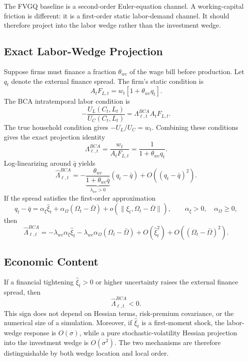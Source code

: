 \documentclass[11pt]{article}
\theoremstyle{plain}
\theoremstyle{definition}
\begin{document}
The FVGQ baseline is a second-order Euler-equation channel. A working-capital
friction is different: it is a first-order static labor-demand channel. It
should therefore project into the labor wedge rather than the investment wedge.

\subsection{Exact Labor-Wedge Projection}

Suppose firms must finance a fraction $\theta_{wc}$ of the wage bill before
production. Let $q_t$ denote the external finance spread. The firm's static
condition is
\begin{equation}
A_tF_{L,t}
=
w_t[1+\theta_{wc}q_t].
\tag{WC-FOC}
\end{equation}
The BCA intratemporal labor condition is
\begin{equation}
-\frac{U_L(C_t,L_t)}{U_C(C_t,L_t)}
=
\Lambda_{\ell,t}^{BCA} A_tF_{L,t}.
\tag{BCA-L}
\end{equation}
The true household condition gives $-U_L/U_C=w_t$. Combining these conditions
gives the exact projection identity
\begin{equation}
\boxed{
\Lambda_{\ell,t}^{BCA}
=
\frac{w_t}{A_tF_{L,t}}
=
\frac{1}{1+\theta_{wc}q_t}
}.
\tag{WC-P}
\end{equation}
Log-linearizing around $\bar q$ yields
\begin{equation}
\hat\Lambda_{\ell,t}^{BCA}
=
-\underbrace{\frac{\theta_{wc}}{1+\theta_{wc}\bar q}}_{\lambda_{wc}>0}
(q_t-\bar q)
+O((q_t-\bar q)^2).
\tag{WC-LIN}
\end{equation}
If the spread satisfies the first-order approximation
\begin{equation}
q_t-\bar q
=
\alpha_\xi\hat\xi_t+\alpha_\Omega(\Omega_t-\bar\Omega)
+o(\|\hat\xi_t,\Omega_t-\bar\Omega\|),
\qquad
\alpha_\xi>0,\quad \alpha_\Omega\ge 0,
\tag{RP-WC}
\end{equation}
then
\begin{equation}
\boxed{
\hat\Lambda_{\ell,t}^{BCA}
=
-\lambda_{wc}\alpha_\xi\hat\xi_t
-\lambda_{wc}\alpha_\Omega(\Omega_t-\bar\Omega)
+O(\hat\xi_t^2)
+O((\Omega_t-\bar\Omega)^2)
}.
\tag{T2}
\end{equation}

\subsection{Economic Content}

If a financial tightening $\hat\xi_t>0$ or higher uncertainty raises the
external finance spread, then
\[
\hat\Lambda_{\ell,t}^{BCA}<0.
\]
This sign does not depend on Hessian terms, risk-premium covariance, or the
numerical size of a simulation. Moreover, if $\hat\xi_t$ is a first-moment
shock, the labor-wedge response is $O(\sigma)$, while a pure
stochastic-volatility Hessian projection into the investment wedge is
$O(\sigma^2)$. The two mechanisms are therefore distinguishable by both wedge
location and local order.
\end{document}

